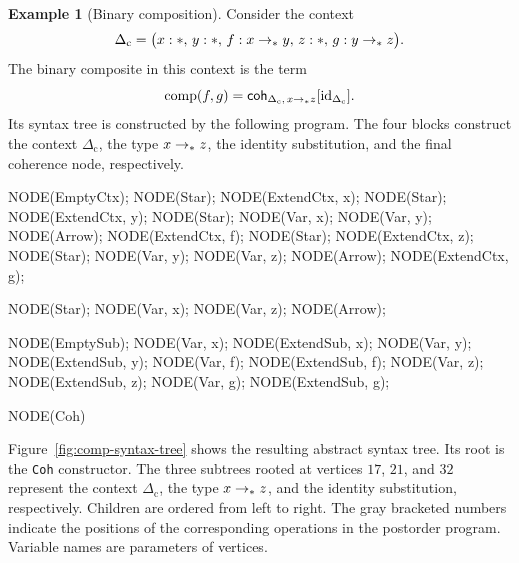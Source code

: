 \documentclass{article}%
\theoremstyle{remark}
\theoremstyle{definition}
\newtheorem{example}[theorem]{Example}
\theoremstyle{definition}
\theoremstyle{plain}
\begin{document}
\begin{example}[Binary composition]
\label{ex:comp}
Consider the context
\[
  \Delta_{\mathrm{c}}
  =
  \bigl(
    x:\obj,\,
    y:\obj,\,
    f:\arr[\obj]{x}{y},\,
    z:\obj,\,
    g:\arr[\obj]{y}{z}
  \bigr).
\]
The binary composite in this context is the term
\[
  \operatorname{comp}(f,g)
  =
  \coh_{\Delta_{\mathrm{c}},\,\arr[\obj]{x}{z}}
      [\mathrm{id}_{\Delta_{\mathrm{c}}}].
\]
Its syntax tree is constructed by the following program. The four blocks
construct the context \(\Delta_{\mathrm{c}}\), the type \(\arr[\obj]{x}{z}\),
the identity substitution, and the final coherence node, respectively.

\begin{githubcode}
NODE(EmptyCtx);
NODE(Star); NODE(ExtendCtx, x);
NODE(Star); NODE(ExtendCtx, y);
NODE(Star); NODE(Var, x); NODE(Var, y); NODE(Arrow);
NODE(ExtendCtx, f);
NODE(Star); NODE(ExtendCtx, z);
NODE(Star); NODE(Var, y); NODE(Var, z); NODE(Arrow);
NODE(ExtendCtx, g);

NODE(Star); NODE(Var, x); NODE(Var, z); NODE(Arrow);

NODE(EmptySub);
NODE(Var, x); NODE(ExtendSub, x);
NODE(Var, y); NODE(ExtendSub, y);
NODE(Var, f); NODE(ExtendSub, f);
NODE(Var, z); NODE(ExtendSub, z);
NODE(Var, g); NODE(ExtendSub, g);

NODE(Coh)
\end{githubcode}

Figure~\ref{fig:comp-syntax-tree} shows the resulting abstract syntax tree. Its
root is the \texttt{Coh} constructor. The three subtrees rooted at vertices
\(17\), \(21\), and \(32\) represent the context \(\Delta_{\mathrm{c}}\), the
type \(\arr[\obj]{x}{z}\), and the identity substitution, respectively. Children
are ordered from left to right. The gray bracketed numbers indicate the
positions of the corresponding operations in the postorder program. Variable
names are parameters of vertices.


\end{example}
\end{document}
